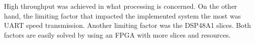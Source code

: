 \documentclass[a1paper,portrait,fontscale=0.43]{baposter}
\begin{document}
\begin{poster}
{High throughput was achieved in what processing is concerned. On the other hand,
the limiting factor that impacted the implemented system the most was UART speed
transmission. Another limiting factor was the DSP48A1 slices. Both factors
are easily solved by using an FPGA with more slices and
resources.
}


\end{poster}
\end{document}
